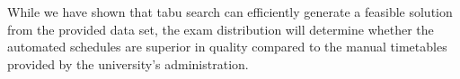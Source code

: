 While we have shown that tabu search can efficiently generate a feasible solution from the provided data set, the exam distribution will determine whether the automated schedules are superior in quality compared to the manual timetables provided by the university's administration.



